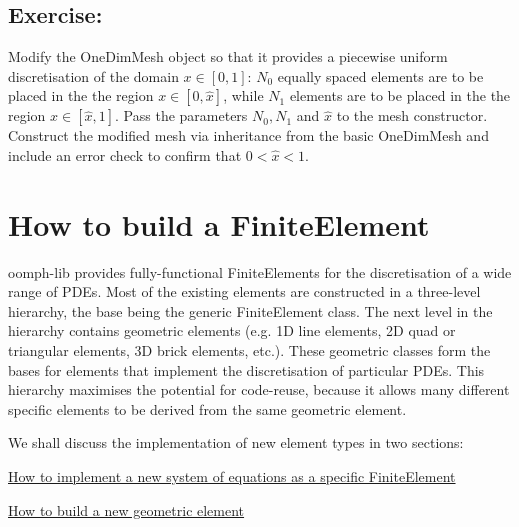 



\hypertarget{index_mes_exercise}{}\subsection{Exercise\+:}\label{index_mes_exercise}
Modify the {\ttfamily One\+Dim\+Mesh} object so that it provides a piecewise uniform discretisation of the domain $ x \in [0,1]$\+: $ N_0 $ equally spaced elements are to be placed in the the region $ x \in [0,\hat{x}]$, while $ N_1 $ elements are to be placed in the the region $ x \in [\hat{x},1]$. Pass the parameters $ N_0, N_1 $ and $\hat{x} $ to the mesh constructor. Construct the modified mesh via inheritance from the basic {\ttfamily One\+Dim\+Mesh} and include an error check to confirm that $ 0 < \hat{x} < 1 $.



 

\hypertarget{index_finiteelement}{}\section{How to build a Finite\+Element}\label{index_finiteelement}
{\ttfamily oomph-\/lib} provides fully-\/functional {\ttfamily Finite\+Elements} for the discretisation of a wide range of P\+D\+Es. Most of the existing elements are constructed in a three-\/level hierarchy, the base being the generic {\ttfamily Finite\+Element} class. The next level in the hierarchy contains geometric elements (e.\+g. 1D line elements, 2D quad or triangular elements, 3D brick elements, etc.). These geometric classes form the bases for elements that implement the discretisation of particular P\+D\+Es. This hierarchy maximises the potential for code-\/reuse, because it allows many different specific elements to be derived from the same geometric element.

We shall discuss the implementation of new element types in two sections\+:
\begin{DoxyItemize}
\item \hyperlink{index_FEequations}{How to implement a new system of equations as a specific Finite\+Element}
\item \hyperlink{index_FEgeom}{How to build a new geometric element}
\end{DoxyItemize}



